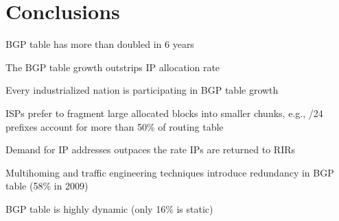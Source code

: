\section{Conclusions}
\label{sec:conclusions}

BGP table has more than doubled in 6 years

The BGP table growth outstrips IP allocation rate

Every industrialized nation is participating in BGP table growth

ISPs prefer to fragment large allocated blocks into smaller chunks, e.g., /24 prefixes account for more than 50\% of routing table

Demand for IP addresses outpaces the rate IPs are returned to RIRs

Multihoming and traffic engineering techniques introduce redundancy in BGP table (58\% in 2009)

BGP table is highly dynamic (only 16\% is static)
